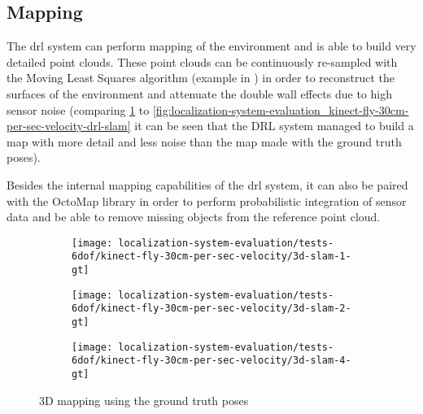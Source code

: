 \subsection{Mapping}

The \gls{drl} system can perform mapping of the environment and is able to build very detailed point clouds. These point clouds can be continuously re-sampled with the Moving Least Squares algorithm (example in ) in order to reconstruct the surfaces of the environment and attenuate the double wall effects due to high sensor noise (comparing \cref{fig:localization-system-evaluation_kinect-fly-30cm-per-sec-velocity-gt-slam} to \cref{fig:localization-system-evaluation_kinect-fly-30cm-per-sec-velocity-drl-slam} it can be seen that the DRL system managed to build a map with more detail and less noise than the map made with the ground truth poses).

Besides the internal mapping capabilities of the \gls{drl} system, it can also be paired with the OctoMap \cite{Hornung2013} library in order to perform probabilistic integration of sensor data and be able to remove missing objects from the reference point cloud.


\begin{figure}[H]
	\centering
	\begin{subfigure}[ht]{0.37\textwidth}
		\centering
		\texttt{[image: localization-system-evaluation/tests-6dof/kinect-fly-30cm-per-sec-velocity/3d-slam-1-gt]}
	\end{subfigure}
	\begin{subfigure}[ht]{0.37\textwidth}
		\centering
		\texttt{[image: localization-system-evaluation/tests-6dof/kinect-fly-30cm-per-sec-velocity/3d-slam-2-gt]}
	\end{subfigure}
	\begin{subfigure}[ht]{0.37\textwidth}
		\centering
		\texttt{[image: localization-system-evaluation/tests-6dof/kinect-fly-30cm-per-sec-velocity/3d-slam-4-gt]}
	\end{subfigure}
	\caption{3D mapping using the ground truth poses}
	\label{fig:localization-system-evaluation_kinect-fly-30cm-per-sec-velocity-gt-slam}
\end{figure}


